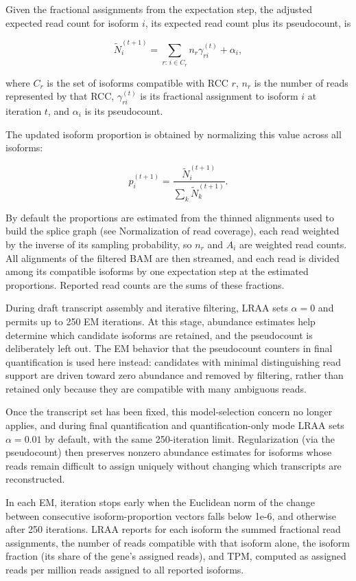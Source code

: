 Given the fractional assignments from the expectation step, the adjusted expected read count for isoform \(i\), its expected read count plus its pseudocount, is

\[\widetilde{N}_i^{(t+1)}=\sum_{r:\,i\in C_r}n_r\gamma_{ri}^{(t)}+\alpha_i,\]

where \(C_r\) is the set of isoforms compatible with RCC \(r\), \(n_r\) is the number of reads represented by that RCC, \(\gamma_{ri}^{(t)}\) is its fractional assignment to isoform \(i\) at iteration \(t\), and \(\alpha_i\) is its pseudocount.

The updated isoform proportion is obtained by normalizing this value across all isoforms:

\[p_i^{(t+1)}=\frac{\widetilde{N}_i^{(t+1)}}{\displaystyle\sum_k\widetilde{N}_k^{(t+1)}}.\]

By default the proportions are estimated from the thinned alignments used to build the splice graph (see Normalization of read coverage), each read weighted by the inverse of its sampling probability, so \(n_r\) and \(A_i\) are weighted read counts. All alignments of the filtered BAM are then streamed, and each read is divided among its compatible isoforms by one expectation step at the estimated proportions. Reported read counts are the sums of these fractions.

During draft transcript assembly and iterative filtering, LRAA sets \(\alpha = 0\) and permits up to 250 EM iterations. At this stage, abundance estimates help determine which candidate isoforms are retained, and the pseudocount is deliberately left out. The EM behavior that the pseudocount counters in final quantification is used here instead: candidates with minimal distinguishing read support are driven toward zero abundance and removed by filtering, rather than retained only because they are compatible with many ambiguous reads.

Once the transcript set has been fixed, this model-selection concern no longer applies, and during final quantification and quantification-only mode LRAA sets \(\alpha = 0.01\) by default, with the same 250-iteration limit. Regularization (via the pseudocount) then preserves nonzero abundance estimates for isoforms whose reads remain difficult to assign uniquely without changing which transcripts are reconstructed.

In each EM, iteration stops early when the Euclidean norm of the change between consecutive isoform-proportion vectors falls below 1e-6, and otherwise after 250 iterations. LRAA reports for each isoform the summed fractional read assignments, the number of reads compatible with that isoform alone, the isoform fraction (its share of the gene's assigned reads), and TPM, computed as assigned reads per million reads assigned to all reported isoforms.


